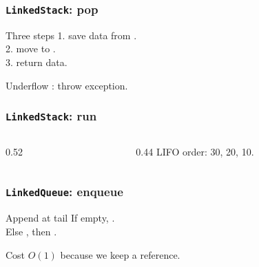 \documentclass[aspectratio=169,10pt,compress]{beamer}
\begin{document}
\begin{frame}[t,fragile]\frametitle{\texttt{LinkedStack}: pop}
      \begin{block}{Three steps}
        \small
        1. save data from .\\
        2. move  to .\\
        3. return data.
      \end{block}
      \begin{block}{Underflow}
        \small
        : throw exception.
      \end{block}
\end{frame}

\begin{frame}[t,fragile]\frametitle{\texttt{LinkedStack}: run}
  \begin{columns}[T]
    \begin{column}{0.52\textwidth}
    \end{column}
    \begin{column}{0.44\textwidth}
      \small
      LIFO order: 30, 20, 10.
    \end{column}
  \end{columns}
\end{frame}

\begin{frame}[t,fragile]\frametitle{\texttt{LinkedQueue}: enqueue}
      \begin{block}{Append at tail}
        \small
        If empty, .\\
        Else , then .
      \end{block}
      \begin{block}{Cost}
        \small
        $O(1)$ because we keep a  reference.
      \end{block}
\end{frame}
\end{document}
